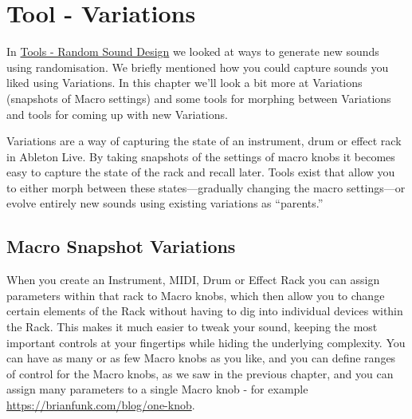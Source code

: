 \documentclass[
  12pt,
  letterpaper,
  oneside,
  open=any]{scrbook}
\begin{document}

\chapter{Tool - Variations}\label{Chapter-025-Tools-Variations}

In \hyperref[Chapter-024-Tools-Random_Sound_Design]{Tools - Random Sound
Design} we looked at ways to generate new sounds using randomisation. We
briefly mentioned how you could capture sounds you liked using
Variations. In this chapter we'll look a bit more at Variations
(snapshots of Macro settings) and some tools for morphing between
Variations and tools for coming up with new Variations.

\begin{tcolorbox}[enhanced jigsaw, breakable, left=2mm, leftrule=.75mm, toprule=.15mm, opacitybacktitle=0.6, toptitle=1mm, coltitle=black, colback=white, colbacktitle=quarto-callout-tip-color!10!white, opacityback=0, rightrule=.15mm, bottomrule=.15mm, titlerule=0mm, title=\textcolor{quarto-callout-tip-color}{\faLightbulb}\hspace{0.5em}{Key idea}, arc=.35mm, bottomtitle=1mm, colframe=quarto-callout-tip-color-frame]

Variations are a way of capturing the state of an instrument, drum or
effect rack in Ableton Live. By taking snapshots of the settings of
macro knobs it becomes easy to capture the state of the rack and recall
later. Tools exist that allow you to either morph between these
states---gradually changing the macro settings---or evolve entirely new
sounds using existing variations as ``parents.''

\end{tcolorbox}

\section{Macro Snapshot Variations}\label{macro-snapshot-variations}

When you create an Instrument, MIDI, Drum or Effect Rack you can assign
parameters within that rack to Macro knobs, which then allow you to
change certain elements of the Rack without having to dig into
individual devices within the Rack. This makes it much easier to tweak
your sound, keeping the most important controls at your fingertips while
hiding the underlying complexity. You can have as many or as few Macro
knobs as you like, and you can define ranges of control for the Macro
knobs, as we saw in the previous chapter, and you can assign many
parameters to a single Macro knob - for example
\url{https://brianfunk.com/blog/one-knob}.
\end{document}
